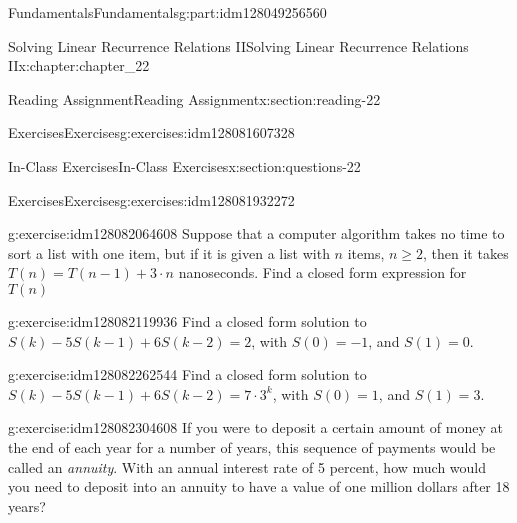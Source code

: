\documentclass[oneside,10pt,]{book}
\numberwithin{equation}{section}
\begin{document}
\begin{partptx}{Fundamentals}{}{Fundamentals}{}{}{g:part:idm128049256560}
\begin{chapterptx}{Solving Linear Recurrence Relations II}{}{Solving Linear Recurrence Relations II}{}{}{x:chapter:chapter_22}
\begin{sectionptx}{Reading Assignment}{}{Reading Assignment}{}{}{x:section:reading-22}
\begin{exercises-subsection}{Exercises}{}{Exercises}{}{}{g:exercises:idm128081607328}
\par\medskip\noindent
\end{exercises-subsection}
\end{sectionptx}
%
%
\typeout{************************************************}
\typeout{************************************************}
%
\begin{sectionptx}{In-Class Exercises}{}{In-Class Exercises}{}{}{x:section:questions-22}
%
%
%
\typeout{************************************************}
\typeout{************************************************}
%
\begin{exercises-subsection}{Exercises}{}{Exercises}{}{}{g:exercises:idm128081932272}
\par\medskip\noindent%
%
\begin{exercisegroup}
\begin{divisionexerciseeg}{1}{}{}{g:exercise:idm128082064608}%
Suppose that a computer algorithm takes no time to sort a list with one item, but if it is given a list with \(n\) items, \(n \geq 2\), then it takes \(T(n) = T(n-1) + 3\cdot n\) nanoseconds.  Find a closed form expression for \(T(n)\)%
\end{divisionexerciseeg}%
\begin{divisionexerciseeg}{2}{}{}{g:exercise:idm128082119936}%
Find a closed form solution to \(S(k) - 5S(k - 1) + 6S(k - 2) = 2\), with \(S(0) = -1\), and \(S(1) = 0\).%
\end{divisionexerciseeg}%
\begin{divisionexerciseeg}{3}{}{}{g:exercise:idm128082262544}%
Find a closed form solution to \(S(k) - 5S(k - 1) + 6S(k - 2) = 7 \cdot 3^k\), with \(S(0) = 1\), and \(S(1) = 3\).%
\end{divisionexerciseeg}%
\begin{divisionexerciseeg}{4}{}{}{g:exercise:idm128082304608}%
If you were to deposit a certain amount of money at the end of each year for a number of years, this sequence of payments would be called an \emph{annuity}.  With an annual interest rate of 5 percent, how much would you need to deposit into an annuity to have a value of one million dollars after 18 years?%
\end{divisionexerciseeg}%
\end{exercisegroup}
\par\medskip\noindent
\end{exercises-subsection}
\end{sectionptx}
%
%
\typeout{************************************************}

\end{chapterptx}
\end{partptx}
\end{document}
